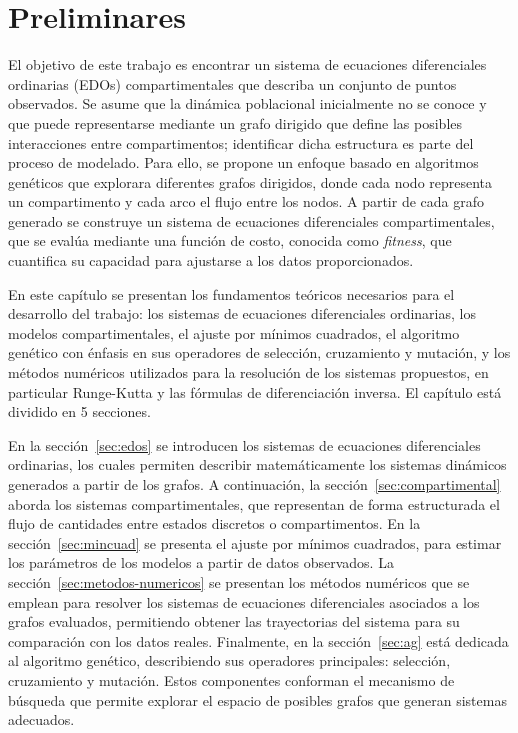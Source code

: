 \usetikzlibrary{positioning}
\chapter{Preliminares}\label{chapter:preliminares}

El objetivo de este trabajo es encontrar un sistema de ecuaciones diferenciales ordinarias (EDOs) compartimentales que describa un conjunto 
de puntos observados. Se asume que la din\'amica poblacional inicialmente no se conoce y que puede representarse mediante un grafo dirigido que 
define las posibles interacciones entre compartimentos; identificar dicha estructura es parte del proceso de modelado. 
Para ello, se propone un enfoque basado en algoritmos genéticos que explorara diferentes grafos dirigidos, donde cada nodo representa un compartimento 
y cada arco el flujo entre los nodos. A partir de cada grafo generado se construye un sistema de ecuaciones diferenciales compartimentales, que 
se evalúa mediante una función de costo, conocida como \textit{fitness}, que cuantifica su capacidad para ajustarse a los datos proporcionados.

En este capítulo se presentan los fundamentos teóricos necesarios para el desarrollo del trabajo: los sistemas de ecuaciones diferenciales ordinarias, 
los modelos compartimentales, el ajuste por mínimos cuadrados, el algoritmo genético con énfasis en sus operadores de selección, cruzamiento y mutación, 
y los métodos numéricos utilizados para la resolución de los sistemas propuestos, en particular Runge-Kutta y las fórmulas de diferenciación inversa. 
El capítulo está dividido en 5 secciones.

En la sección~\ref{sec:edos} se introducen los sistemas de ecuaciones diferenciales ordinarias, los cuales permiten describir matemáticamente los sistemas dinámicos 
generados a partir de los grafos. A continuación, la sección~\ref{sec:compartimental} aborda los sistemas compartimentales, que representan de forma estructurada el 
flujo de cantidades entre estados discretos o compartimentos. En la sección~\ref{sec:mincuad} se presenta el ajuste por mínimos cuadrados, para estimar los parámetros 
de los modelos a partir de datos observados. La sección~\ref{sec:metodos-numericos} se presentan los métodos numéricos que se emplean para resolver los sistemas de 
ecuaciones diferenciales asociados a los grafos evaluados, permitiendo obtener las trayectorias del sistema para su comparación con los datos reales. Finalmente, en 
la sección~\ref{sec:ag} está dedicada al algoritmo genético, describiendo sus operadores principales: selección, cruzamiento y mutación. Estos componentes conforman 
el mecanismo de búsqueda que permite explorar el espacio de posibles grafos que generan sistemas adecuados. 

